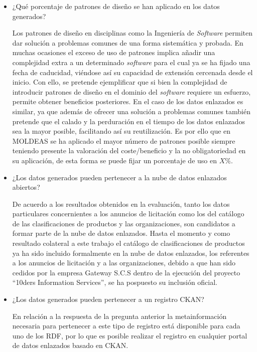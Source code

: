 \begin{itemize}
 \item ¿Qué porcentaje de patrones de diseño se han aplicado en los datos generados?

Los patrones de diseño en disciplinas como la Ingeniería de \textit{Software} permiten dar solución a problemas comunes de una 
forma sistemática y probada. En muchas ocasiones el exceso de uso de patrones implica añadir una complejidad extra 
a un determinado \textit{software} para el cual ya se ha fijado una fecha de caducidad, viéndose así 
 su capacidad de extensión cercenada desde el inicio. Con ello, se pretende ejemplificar que si bien la complejidad 
de introducir patrones de diseño en el dominio del \textit{software} requiere un esfuerzo, permite obtener beneficios 
posteriores. En el caso de los datos enlazados es similar, ya que además de ofrecer una solución a problemas comunes también pretende 
que el calado y la perduración en el tiempo de los datos enlazados sea la mayor posible, facilitando así 
su reutilización. Es por ello que en MOLDEAS se ha aplicado el mayor número de patrones posible siempre teniendo presente 
la valoración del coste/beneficio y la no obligatoriedad en su aplicación, de esta forma se puede fijar un porcentaje de uso en $X\%$.

 \item ¿Los datos generados pueden pertenecer a la nube de datos enlazados abiertos?

De acuerdo a los resultados obtenidos en la evaluación, tanto los datos particulares concernientes a los anuncios de licitación 
como los del catálogo de las clasificaciones de productos y las organizaciones, son candidatos a formar parte 
de la nube de datos enlazados. Hasta el momento y como resultado colateral a este trabajo el catálogo de 
clasificaciones de productos ya ha sido incluido formalmente en la nube de datos enlazados, los referentes a 
los anuncios de licitación y a las organizaciones, debido a que han sido cedidos por la empresa Gateway S.C.S 
dentro de la ejecución del proyecto ``10ders Information Services'', se ha pospuesto su inclusión oficial.

 \item ¿Los datos generados pueden pertenecer a un registro CKAN? 

En relación a la respuesta de la pregunta anterior la metainformación necesaria para \linebreak pertenecer a este tipo 
de registro está disponible para cada uno de los \dataset \gls{RDF}, por lo que es posible realizar el registro en cualquier 
portal de datos enlazados basado en \gls{CKAN}.


\end{itemize}
